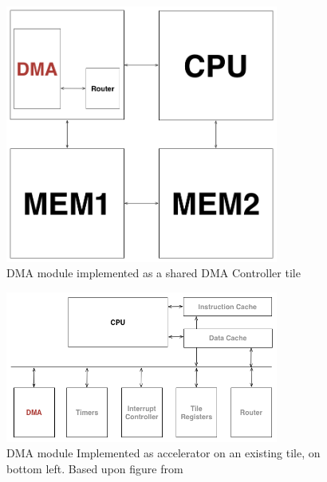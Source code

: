 \begin{figure}[h!]
    \centering
    \includegraphics[width=0.8\textwidth]{Figures/DMA/DMATile}
    \caption{DMA module implemented as a shared DMA Controller tile}
    \label{fig:DMATile}
\end{figure}

\begin{figure}[h!]
    \centering
    \includegraphics[width=0.8\textwidth]{Figures/DMA/Accelerator}
    \caption{DMA module Implemented as accelerator on an existing tile, on bottom left. Based upon figure from \cite{shmac-plan}}
    \label{fig:DMAAccelerator}
\end{figure}

